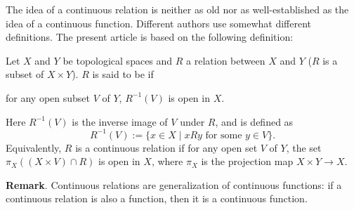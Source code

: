 \documentclass[12pt]{article}
\begin{document}
The idea of a continuous relation is neither as old nor as well-established as the idea of a continuous function.
Different authors use somewhat different definitions.  The present article is based on the following definition:

Let $X$ and $Y$ be topological spaces and $R$ a relation between $X$ and $Y$ ($R$ is a subset of $X\times Y$).  $R$ is said to be  if 
\begin{center} for any open subset $V$ of $Y$, $R^{-1}(V)$ is open in $X$.\end{center}  
Here $R^{-1}(V)$ is the inverse image of $V$ under $R$, and is defined as $$R^{-1}(V):=\lbrace x\in X\mid xRy\mbox{ for some }y\in V\rbrace.$$  Equivalently, $R$ is a continuous relation if for any open set $V$ of $Y$, the set $\pi_X((X\times V)\cap R)$ is open in $X$, where $\pi_X$ is the projection map $X\times  Y\to X$.

\textbf{Remark}.  Continuous relations are generalization of continuous functions: if a continuous relation is also a function, then it is a continuous function.
\end{document}

